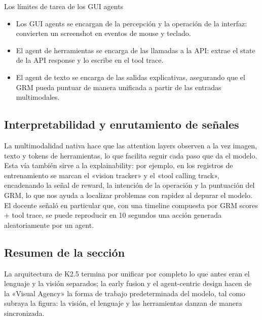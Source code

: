 \begin{knowledgebox}{Los límites de tarea de los GUI agents}
\begin{itemize}
    \item Los GUI agents se encargan de la percepción y la operación de la interfaz: convierten un screenshot en eventos de mouse y teclado.
    \item El agent de herramientas se encarga de las llamadas a la API: extrae el state de la API response y lo escribe en el tool trace.
    \item El agent de texto se encarga de las salidas explicativas, asegurando que el GRM pueda puntuar de manera unificada a partir de las entradas multimodales.
\end{itemize}
\end{knowledgebox}

\subsection{Interpretabilidad y enrutamiento de señales}
La multimodalidad nativa hace que las attention layers observen a la vez imagen, texto y tokens de herramientas, lo que facilita seguir cada paso que da el modelo. Esta vía también sirve a la explainability: por ejemplo, en los registros de entrenamiento se marcan el «vision tracker» y el «tool calling track», encadenando la señal de reward, la intención de la operación y la puntuación del GRM, lo que nos ayuda a localizar problemas con rapidez al depurar el modelo. El docente señaló en particular que, con una timeline compuesta por GRM scores + tool trace, se puede reproducir en 10 segundos una acción generada aleatoriamente por un agent.

\subsection{Resumen de la sección}
La arquitectura de K2.5 termina por unificar por completo lo que antes eran el lenguaje y la visión separados; la early fusion y el agent-centric design hacen de la «Visual Agency» la forma de trabajo predeterminada del modelo, tal como subraya la figura: la visión, el lenguaje y las herramientas danzan de manera sincronizada.

